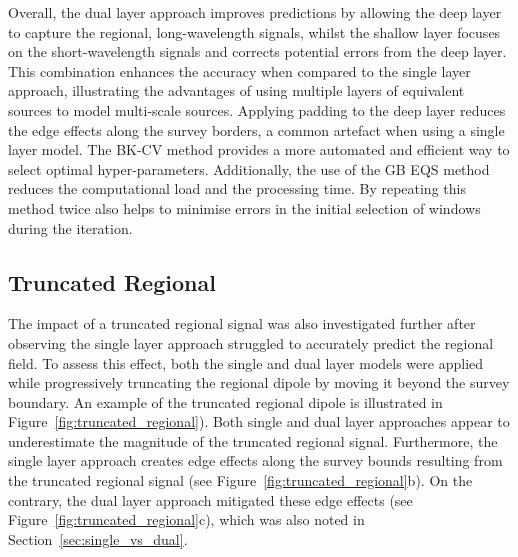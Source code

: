 Overall, the dual layer approach improves predictions by allowing the deep layer to capture the regional, long-wavelength signals, whilst the shallow layer focuses on the short-wavelength signals and corrects potential errors from the deep layer. This combination enhances the accuracy when compared to the single layer approach, illustrating the advantages of using multiple layers of equivalent sources to model multi-scale sources. Applying padding to the deep layer reduces the edge effects along the survey borders, a common artefact when using a single layer model. The BK-CV method provides a more automated and efficient way to select optimal hyper-parameters. Additionally, the use of the GB EQS method reduces the computational load and the processing time. By repeating this method twice also helps to minimise errors in the initial selection of windows during the iteration.
\clearpage

\subsection{Truncated Regional}
\label{sec:truncated_regional}
The impact of a truncated regional signal was also investigated further after observing the single layer approach struggled to accurately predict the regional field. To assess this effect, both the single and dual layer models were applied while progressively truncating the regional dipole by moving it beyond the survey boundary. An example of the truncated regional dipole is illustrated in Figure~\ref{fig:truncated_regional}). Both single and dual layer approaches appear to underestimate the magnitude of the truncated regional signal. Furthermore, the single layer approach creates edge effects along the survey bounds resulting from the truncated regional signal (see Figure~\ref{fig:truncated_regional}b). On the contrary, the dual layer approach mitigated these edge effects (see Figure~\ref{fig:truncated_regional}c), which was also noted in Section~\ref{sec:single_vs_dual}.

